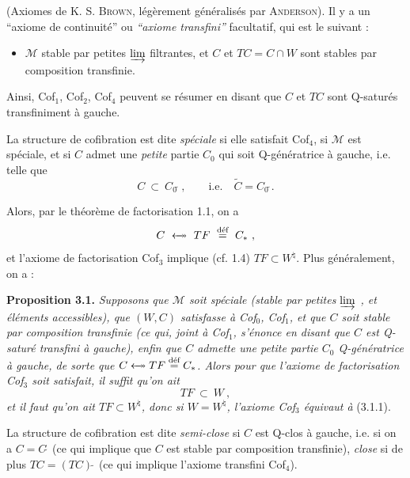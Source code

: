 \documentclass[11pt]{article}
\newcommand{\printedpage}[1]{\marginpar{\footnotesize p.~#1}}
\newcommand{\msp}[1]{\marginpar{\footnotesize [#1]}}
\newcommand{\M}{\mathcal{M}}
\newcommand{\deq}{\overset{\text{déf}}{=}}
\newcommand{\Qs}{\tilde{\ }}
\newcommand{\fact}{\mathrel{\leftarrow\mkern-11mu\twoheadrightarrow}}
\begin{document}
(Axiomes de K. S. \textsc{Brown}, légèrement généralisés par \textsc{Anderson}). Il y a un ``axiome
\printedpage{20}
de continuité'' ou \textit{``axiome transfini''} facultatif, qui est le suivant :

\begin{itemize}[leftmargin=4em,labelwidth=3.5em,align=left]
\item[Cof$_4$ :] $\M$ stable par petites $\varinjlim$ filtrantes, et $C$ et $TC = C\cap W$ sont stables par composition transfinie.
\end{itemize}

Ainsi, Cof$_1$, Cof$_2$, Cof$_4$ peuvent se résumer en disant que $C$ et $TC$ sont Q-saturés transfiniment à gauche.

La structure de cofibration est dite \textit{spéciale} si elle satisfait Cof$_4$, si $\M$ est spéciale, et si $C$ admet une \textit{petite} partie $C_0$ qui soit Q-génératrice à gauche, i.e. telle que
\[
C \ \subset\ C_0\Qs\,, \qquad \text{i.e.}\quad \tilde{C}=C_0\Qs. \tag*{(3.1)}
\]

\msp{page 34}
Alors, par le théorème de factorisation 1.1, on a
\[
C \ \fact\ TF \ \deq\ C_* \ ,
\]
et l'axiome de factorisation Cof$_3$ implique (cf. 1.4) $TF\subset W^{\natural}$. Plus généralement, on a :

\textbf{Proposition 3.1.} \textit{Supposons que $\M$ soit spéciale (stable par petites $\varinjlim$ , et éléments accessibles), que $(W,C)$ satisfasse à Cof$_0$, Cof$_1$, et que $C$ soit stable par composition transfinie (ce qui, joint à Cof$_1$, s'énonce en disant que $C$ est Q-saturé transfini à gauche), enfin que $C$ admette une petite partie $C_0$ Q-génératrice à gauche, de sorte que $C\fact TF\deq C_*$. Alors pour que l'axiome de factorisation Cof$_3$ soit satisfait, il suffit qu'on ait}
\[
TF \ \subset\ W \ , \tag*{(3.1.1)}
\]
\textit{et il faut qu'on ait $TF\subset W^{\natural}$, donc si $W=W^{\natural}$, l'axiome Cof$_3$ équivaut à} (3.1.1).

La structure de cofibration est dite \textit{semi-close} si $C$ est Q-clos à gauche, i.e. si on a $C=C\Qs$ (ce qui implique que $C$ est stable par composition transfinie), \textit{close} si de plus $TC=(TC)\Qs$ (ce qui implique l'axiome transfini Cof$_4$).
\end{document}

